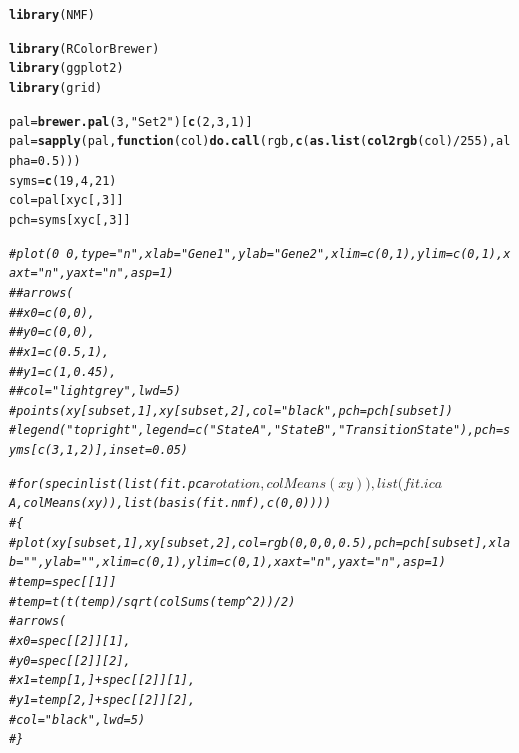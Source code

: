 \documentclass{article}\usepackage[]{graphicx}\usepackage[]{color}
\makeatletter
\newcommand{\hlnum}[1]{\textcolor[rgb]{0.686,0.059,0.569}{#1}}%
\newcommand{\hlstr}[1]{\textcolor[rgb]{0.192,0.494,0.8}{#1}}%
\newcommand{\hlcom}[1]{\textcolor[rgb]{0.678,0.584,0.686}{\textit{#1}}}%
\newcommand{\hlopt}[1]{\textcolor[rgb]{0,0,0}{#1}}%
\newcommand{\hlstd}[1]{\textcolor[rgb]{0.345,0.345,0.345}{#1}}%
\newcommand{\hlkwa}[1]{\textcolor[rgb]{0.161,0.373,0.58}{\textbf{#1}}}%
\newcommand{\hlkwb}[1]{\textcolor[rgb]{0.69,0.353,0.396}{#1}}%
\newcommand{\hlkwc}[1]{\textcolor[rgb]{0.333,0.667,0.333}{#1}}%
\newcommand{\hlkwd}[1]{\textcolor[rgb]{0.737,0.353,0.396}{\textbf{#1}}}%
\newenvironment{kframe}{%
 \def\at@end@of@kframe{}%
 \ifinner\ifhmode%
  \def\at@end@of@kframe{\end{minipage}}%
  \begin{minipage}{\columnwidth}%
 \fi\fi%
 \def\FrameCommand##1{\hskip\@totalleftmargin \hskip-\fboxsep
 \colorbox{shadecolor}{##1}\hskip-\fboxsep
     \hskip-\linewidth \hskip-\@totalleftmargin \hskip\columnwidth}%
 \MakeFramed {\advance\hsize-\width
   \@totalleftmargin\z@ \linewidth\hsize
   \@setminipage}}%
 {\par\unskip\endMakeFramed%
 \at@end@of@kframe}
\newenvironment{knitrout}{}{} %
\makeatother
\begin{document}
\begin{knitrout}
\color{fgcolor}\begin{kframe}
\begin{alltt}
\hlkwd{library}\hlstd{(NMF)}
\end{alltt}


{\ttfamily\noindent\itshape\color{messagecolor}{\#\# Loading required package: pkgmaker\\\#\# Loading required package: registry\\\#\# Loading required package: rngtools\\\#\# Loading required package: cluster\\\#\# NMF - BioConductor layer [OK] | Shared memory capabilities [OK] | Cores 7/8}}\begin{alltt}
\hlkwd{library}\hlstd{(RColorBrewer)}
\hlkwd{library}\hlstd{(ggplot2)}
\hlkwd{library}\hlstd{(grid)}

\hlstd{pal} \hlkwb{=} \hlkwd{brewer.pal}\hlstd{(}\hlnum{3}\hlstd{,} \hlstr{"Set2"}\hlstd{)[}\hlkwd{c}\hlstd{(}\hlnum{2}\hlstd{,} \hlnum{3}\hlstd{,} \hlnum{1}\hlstd{)]}
\hlstd{pal} \hlkwb{=} \hlkwd{sapply}\hlstd{(pal,} \hlkwa{function}\hlstd{(}\hlkwc{col}\hlstd{)} \hlkwd{do.call}\hlstd{(rgb,} \hlkwd{c}\hlstd{(}\hlkwd{as.list}\hlstd{(}\hlkwd{col2rgb}\hlstd{(col)}\hlopt{/}\hlnum{255}\hlstd{),} \hlkwc{alpha} \hlstd{=} \hlnum{0.5}\hlstd{)))}
\hlstd{syms} \hlkwb{=} \hlkwd{c}\hlstd{(}\hlnum{19}\hlstd{,} \hlnum{4}\hlstd{,} \hlnum{21}\hlstd{)}
\hlstd{col} \hlkwb{=} \hlstd{pal[xyc[,}\hlnum{3}\hlstd{]]}
\hlstd{pch} \hlkwb{=} \hlstd{syms[xyc[,}\hlnum{3}\hlstd{]]}

\hlcom{# plot(0 ~ 0, type = "n", xlab = "Gene 1", ylab = "Gene 2", xlim = c(0, 1), ylim = c(0, 1), xaxt = "n", yaxt = "n", asp = 1)}
\hlcom{# # arrows(}
\hlcom{# # 	x0 = c(0, 0), }
\hlcom{# # 	y0 = c(0, 0), }
\hlcom{# # 	x1 = c(0.5, 1), }
\hlcom{# # 	y1 = c(1, 0.45), }
\hlcom{# # 	col = "lightgrey", lwd = 5)}
\hlcom{# points(xy[subset,1], xy[subset,2], col = "black", pch = pch[subset])}
\hlcom{# legend("topright", legend = c("State A", "State B", "Transition State"), pch = syms[c(3, 1, 2)], inset = 0.05)}

\hlcom{# for (spec in list(list(fit.pca$rotation, colMeans(xy)), list(fit.ica$A, colMeans(xy)), list(basis(fit.nmf), c(0, 0))))}
\hlcom{# \{}
\hlcom{# 	plot(xy[subset,1], xy[subset,2], col = rgb(0, 0, 0, 0.5), pch = pch[subset], xlab = "", ylab = "", xlim = c(0, 1), ylim = c(0, 1), xaxt = "n", yaxt = "n", asp = 1)}
\hlcom{# 	temp = spec[[1]]}
\hlcom{# 	temp = t(t(temp) / sqrt(colSums(temp^2)) / 2)}
\hlcom{# 	arrows(}
\hlcom{# 		x0 = spec[[2]][1], }
\hlcom{# 		y0 = spec[[2]][2], }
\hlcom{# 		x1 = temp[1,] + spec[[2]][1], }
\hlcom{# 		y1 = temp[2,] + spec[[2]][2], }
\hlcom{# 		col = "black", lwd = 5)}
\hlcom{# \}}


\end{alltt}
\end{kframe}
\end{knitrout}
\end{document}
